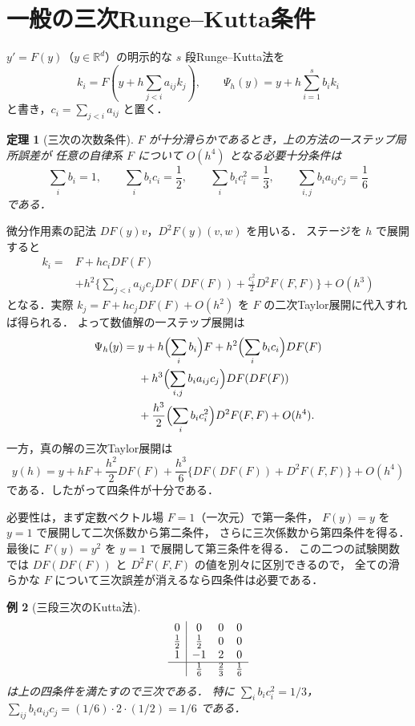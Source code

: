 \documentclass[a5paper,10pt,onecolumn]{jsarticle}
\makeatletter
\theoremstyle{mathnotetheorem}
\newtheorem{theorem}{定理}[section]
\newtheorem{example}[theorem]{例}
\renewcommand{\proofname}{証明}
\renewenvironment{proof}[1][\proofname]{%
  \par\pushQED{\qed}\normalfont\topsep4\p@\@plus2\p@\relax
  \trivlist\item[\hskip\labelsep\bfseries #1]\ignorespaces
}{\popQED\endtrivlist\@endpefalse}
\makeatother
\begin{document}
\section{一般の三次Runge--Kutta条件}
$y'=F(y)$（$y\in\mathbb R^d$）の明示的な $s$ 段Runge--Kutta法を
\[
 k_i=F\!\left(y+h\sum_{j<i}a_{ij}k_j\right),\qquad
 \Psi_h(y)=y+h\sum_{i=1}^s b_i k_i
\]
と書き，$c_i=\sum_{j<i}a_{ij}$ と置く．
\begin{theorem}[三次の次数条件]
$F$ が十分滑らかであるとき，上の方法の一ステップ局所誤差が
任意の自律系 $F$ について $O(h^4)$ となる必要十分条件は
\[
 \sum_i b_i=1,\qquad \sum_i b_ic_i=\frac12,
 \qquad\sum_i b_ic_i^2=\frac13,\qquad
 \sum_{i,j}b_i a_{ij}c_j=\frac16
\]
である．
\end{theorem}
\begin{proof}
微分作用素の記法 $DF(y)v$，$D^2F(y)(v,w)$ を用いる．
ステージを $h$ で展開すると
\begin{align*}
 k_i={}&F+h c_iDF(F)\\
 &+h^2\biggl\{\sum_{j<i}a_{ij}c_jDF(DF(F))
       +\frac{c_i^2}{2}D^2F(F,F)\biggr\}+O(h^3)
\end{align*}
となる．実際 $k_j=F+h c_jDF(F)+O(h^2)$ を
$F$ の二次Taylor展開に代入すれば得られる．
よって数値解の一ステップ展開は
\begin{align*}
 \Psi_h(y)={}&y+h\Bigl(\sum_i b_i\Bigr)F
 +h^2\Bigl(\sum_i b_ic_i\Bigr)DF(F)\\
 &+h^3\Bigl(\sum_{i,j}b_i a_{ij}c_j\Bigr)DF(DF(F))\\
 &+\frac{h^3}{2}\Bigl(\sum_i b_ic_i^2\Bigr)D^2F(F,F)+O(h^4).
\end{align*}
一方，真の解の三次Taylor展開は
\[
 y(h)=y+hF+\frac{h^2}{2}DF(F)
 +\frac{h^3}{6}\{DF(DF(F))+D^2F(F,F)\}+O(h^4)
\]
である．したがって四条件が十分である．

必要性は，まず定数ベクトル場 $F=1$（一次元）で第一条件，
$F(y)=y$ を $y=1$ で展開して二次係数から第二条件，
さらに三次係数から第四条件を得る．最後に $F(y)=y^2$ を
$y=1$ で展開して第三条件を得る．
この二つの試験関数では
$DF(DF(F))$ と $D^2F(F,F)$ の値を別々に区別できるので，
全ての滑らかな $F$ について三次誤差が消えるなら四条件は必要である．
\end{proof}
\begin{example}[三段三次のKutta法]
\[
 \begin{array}{c|ccc}
 0&0&0&0\\
 \frac12&\frac12&0&0\\
 1&-1&2&0\\ \hline
 &\frac16&\frac23&\frac16
 \end{array}
\]
は上の四条件を満たすので三次である．
特に $\sum_i b_i c_i^2=1/3$，
$\sum_{ij}b_i a_{ij}c_j=(1/6)\cdot 2\cdot(1/2)=1/6$ である．
\end{example}
\end{document}
